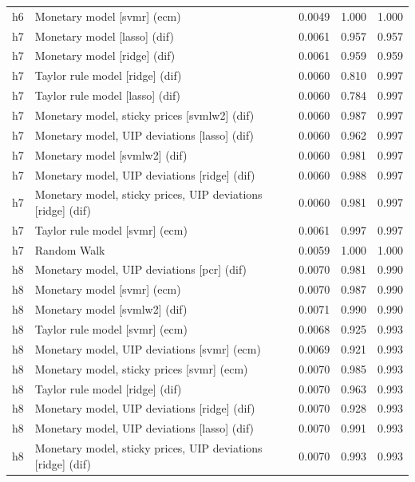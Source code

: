 \begin{ThreePartTable}
\begin{longtable}[t]{cp{5.5cm}ccc}
h6 & \raggedright Monetary model [svmr] (ecm) & 0.0049 & 1.000 & 1.000\\
\addlinespace
h7 & \raggedright Monetary model [lasso] (dif) & 0.0061 & 0.957 & 0.957\\
h7 & \raggedright Monetary model [ridge] (dif) & 0.0061 & 0.959 & 0.959\\
h7 & \raggedright Taylor rule model [ridge] (dif) & 0.0060 & 0.810 & 0.997\\
h7 & \raggedright Taylor rule model [lasso] (dif) & 0.0060 & 0.784 & 0.997\\
h7 & \raggedright Monetary model, sticky prices [svmlw2] (dif) & 0.0060 & 0.987 & 0.997\\
h7 & \raggedright Monetary model, UIP deviations [lasso] (dif) & 0.0060 & 0.962 & 0.997\\
h7 & \raggedright Monetary model [svmlw2] (dif) & 0.0060 & 0.981 & 0.997\\
h7 & \raggedright Monetary model, UIP deviations [ridge] (dif) & 0.0060 & 0.988 & 0.997\\
h7 & \raggedright Monetary model, sticky prices, UIP deviations [ridge] (dif) & 0.0060 & 0.981 & 0.997\\
h7 & \raggedright Taylor rule model [svmr] (ecm) & 0.0061 & 0.997 & 0.997\\
h7 & \raggedright Random Walk & 0.0059 & 1.000 & 1.000\\
\addlinespace
h8 & \raggedright Monetary model, UIP deviations [pcr] (dif) & 0.0070 & 0.981 & 0.990\\
h8 & \raggedright Monetary model [svmr] (ecm) & 0.0070 & 0.987 & 0.990\\
h8 & \raggedright Monetary model [svmlw2] (dif) & 0.0071 & 0.990 & 0.990\\
h8 & \raggedright Taylor rule model [svmr] (ecm) & 0.0068 & 0.925 & 0.993\\
h8 & \raggedright Monetary model, UIP deviations [svmr] (ecm) & 0.0069 & 0.921 & 0.993\\
h8 & \raggedright Monetary model, sticky prices [svmr] (ecm) & 0.0070 & 0.985 & 0.993\\
h8 & \raggedright Taylor rule model [ridge] (dif) & 0.0070 & 0.963 & 0.993\\
h8 & \raggedright Monetary model, UIP deviations [ridge] (dif) & 0.0070 & 0.928 & 0.993\\
h8 & \raggedright Monetary model, UIP deviations [lasso] (dif) & 0.0070 & 0.991 & 0.993\\
h8 & \raggedright Monetary model, sticky prices, UIP deviations [ridge] (dif) & 0.0070 & 0.993 & 0.993\\

\end{longtable}
\end{ThreePartTable}
